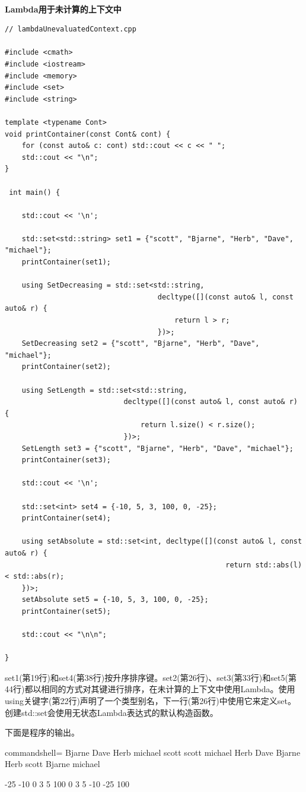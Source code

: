 \hspace*{\fill} \\ %
\noindent
\textbf{Lambda用于未计算的上下文中}
\begin{lstlisting}[style=styleCXX]
// lambdaUnevaluatedContext.cpp

#include <cmath>
#include <iostream>
#include <memory>
#include <set>
#include <string>

template <typename Cont>
void printContainer(const Cont& cont) {
	for (const auto& c: cont) std::cout << c << " ";
	std::cout << "\n";
}

 int main() {
	
	std::cout << '\n';
	
	std::set<std::string> set1 = {"scott", "Bjarne", "Herb", "Dave", "michael"};
	printContainer(set1);
	
	using SetDecreasing = std::set<std::string,
									decltype([](const auto& l, const auto& r) {
	 									return l > r;
									})>;
	SetDecreasing set2 = {"scott", "Bjarne", "Herb", "Dave", "michael"};
	printContainer(set2);
	
	using SetLength = std::set<std::string,
							decltype([](const auto& l, const auto& r) {
	 							return l.size() < r.size();
							})>;
	SetLength set3 = {"scott", "Bjarne", "Herb", "Dave", "michael"};
	printContainer(set3);
	
	std::cout << '\n';
	
	std::set<int> set4 = {-10, 5, 3, 100, 0, -25};
	printContainer(set4);
	
	using setAbsolute = std::set<int, decltype([](const auto& l, const auto& r) {
	 												return std::abs(l)< std::abs(r);
	})>;
	setAbsolute set5 = {-10, 5, 3, 100, 0, -25};
	printContainer(set5);
	
	std::cout << "\n\n";

}
\end{lstlisting}

set1(第19行)和set4(第38行)按升序排序键。set2(第26行)、set3(第33行)和set5(第44行)都以相同的方式对其键进行排序，在未计算的上下文中使用Lambda。使用using关键字(第22行)声明了一个类型别名，下一行(第26行)中使用它来定义set。创建std::set会使用无状态Lambda表达式的默认构造函数。

下面是程序的输出。

\begin{tcblisting}{commandshell={}}
Bjarne Dave Herb michael scott
scott michael Herb Dave Bjarne
Herb scott Bjarne michael

-25 -10 0 3 5 100
0 3 5 -10 -25 100
\end{tcblisting}

